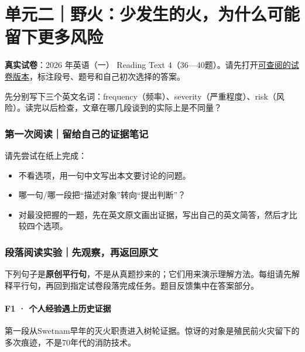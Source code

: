 \documentclass[
  11pt,
]{ctexart}
\providecommand{\tightlist}{%
  \setlength{\itemsep}{0pt}\setlength{\parskip}{0pt}}
\begin{document}
\section{单元二｜野火：少发生的火，为什么可能留下更多风险}\label{ux5355ux5143ux4e8cux91ceux706bux5c11ux53d1ux751fux7684ux706bux4e3aux4ec0ux4e48ux53efux80fdux7559ux4e0bux66f4ux591aux98ceux9669}

\textbf{真实试卷}：2026 年英语（一） Reading Text
4（36---40题）。请先打开\href{https://english-exam.lazynote.cn/kaoyan/sections/2026-english-one/section2-part-a-4/}{可查阅的试卷版本}，标注段号、题号和自己初次选择的答案。

先分别写下三个英文名词：frequency（频率）、severity（严重程度）、risk（风险）。读完以后检查，文章在哪几段谈到的实际上是不同量？

\subsubsection{第一次阅读｜留给自己的证据笔记}\label{ux7b2cux4e00ux6b21ux9605ux8bfbux7559ux7ed9ux81eaux5df1ux7684ux8bc1ux636eux7b14ux8bb0-1}

请先尝试在纸上完成：

\begin{itemize}
\tightlist
\item
  不看选项，用一句中文写出本文要讨论的问题。
\item
  哪一句/哪一段把``描述对象''转向``提出判断''？
\item
  对最没把握的一题，先在英文原文画出证据，写出自己的英文简答，然后才比较四个选项。
\end{itemize}

\subsubsection{段落阅读实验｜先观察，再返回原文}\label{ux6bb5ux843dux9605ux8bfbux5b9eux9a8cux5148ux89c2ux5bdfux518dux8fd4ux56deux539fux6587-1}

下列句子是\textbf{原创平行句}，不是从真题抄来的；它们用来演示理解方法。每组请先解释平行句，再回到指定试卷段落完成任务。题目反馈集中在答案部分。

\paragraph{F1 ·
个人经验遇上历史证据}\label{f1-ux4e2aux4ebaux7ecfux9a8cux9047ux4e0aux5386ux53f2ux8bc1ux636e}

第一段从Swetnam早年的灭火职责进入树轮证据。惊讶的对象是殖民前火灾留下的多次痕迹，不是70年代的消防技术。
\end{document}
